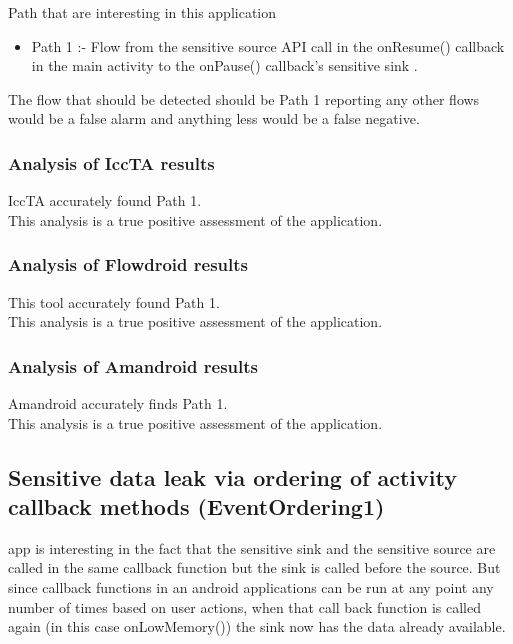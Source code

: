 \documentclass[journal]{IEEEtran}
\begin{document}
Path that are interesting in this application
\begin{itemize}
	\item Path 1 :-  Flow  from the sensitive source API call in the onResume() callback in the main activity to the onPause() callback's sensitive sink .
\end{itemize}

The flow that should be detected should be Path 1 reporting any other flows would be a false alarm and anything less would be a false negative.\\
  

\subsubsection{Analysis of IccTA results}
IccTA accurately found Path 1.\\
This analysis is a true positive assessment of the application.\\
\subsubsection{Analysis of Flowdroid results}
This tool accurately found Path 1.\\
This analysis is a true positive assessment of the application.\\

\subsubsection{Analysis of Amandroid results}
Amandroid accurately finds Path 1.\\
This analysis is a true positive assessment of the application.\\

\subsection{Sensitive data leak via ordering of activity callback methods (EventOrdering1)}
% 
% 
% 
% 
 app is interesting in the fact that the sensitive sink and the sensitive source are called in the same callback function but the sink is called before the source. But since callback functions in an android applications can be run at any point any number of times based on user actions, when that call back function is called again (in this case onLowMemory()) the sink now has the data already available.\\
\end{document}
